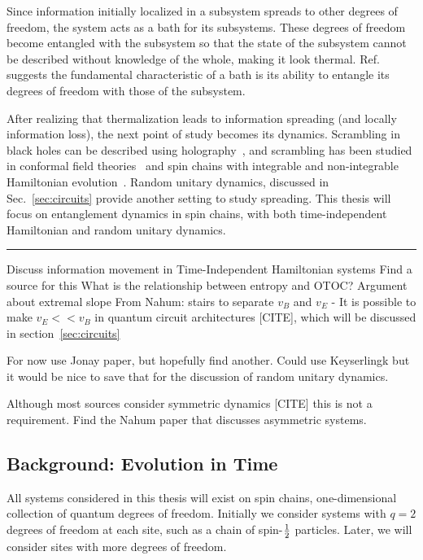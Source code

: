 Since information initially localized in a subsystem spreads to other degrees of freedom, the system acts as a bath for its subsystems. These degrees of freedom become entangled with the subsystem so that the state of the subsystem cannot be described without knowledge of the whole, making it look thermal. Ref.~\cite{Nandkishore2015} suggests the fundamental characteristic of a bath is its ability to entangle its degrees of freedom with those of the subsystem.

After realizing that thermalization leads to information spreading (and locally information loss), the next point of study becomes its dynamics. Scrambling in black holes can be described using holography~\cite{Sekino2008, Shenker2014}, and scrambling has been studied in conformal field theories~\cite{Calabrese2005} and spin chains with integrable and non-integrable Hamiltonian evolution~\cite{Fagotti2008, Luchli2008, Kim2013, Baradson2012}. Random unitary dynamics, discussed in Sec.~\ref{sec:circuits} provide another setting to study spreading. This thesis will focus on entanglement dynamics in spin chains, with both time-independent Hamiltonian and random unitary dynamics. 

\hrule

Discuss information movement in Time-Independent Hamiltonian systems
  Find a source for this
  What is the relationship between entropy and OTOC?
  Argument about extremal slope
    From Nahum: stairs to separate $v_B$ and $v_E$ - It is possible to make $v_E << v_B$ in quantum circuit architectures [CITE], which will be discussed in section~\ref{sec:circuits}
    
For now use Jonay paper, but hopefully find another. Could use Keyserlingk but it would be nice to save that for the discussion of random unitary dynamics.

Although most sources consider symmetric dynamics [CITE] this is not a requirement. Find the Nahum paper that discusses asymmetric systems.

\subsection{Background: Evolution in Time} \label{sub:evoltime}

All systems considered in this thesis will exist on spin chains, one-dimensional collection of quantum degrees of freedom. Initially we consider systems with $q=2$ degrees of freedom at each site, such as a chain of spin-$\frac{1}{2}$ particles. Later, we will consider sites with more degrees of freedom. 


